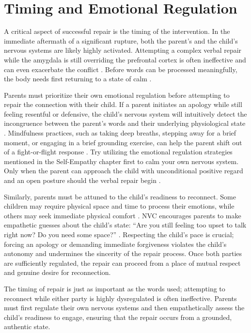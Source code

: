\section{Timing and Emotional Regulation}

A critical aspect of successful repair is the timing of the intervention.
In the immediate aftermath of a significant rupture, both the parent's and the child's nervous systems are likely highly activated.
Attempting a complex verbal repair while the amygdala is still overriding the prefrontal cortex is often ineffective and can even exacerbate the conflict \citep{gottman1997}.
Before words can be processed meaningfully, the body needs first returning to a state of calm \citep{porges2011}.

Parents must prioritize their own emotional regulation before attempting to repair the connection with their child.
If a parent initiates an apology while still feeling resentful or defensive, the child's nervous system will intuitively detect the incongruence between the parent's words and their underlying physiological state \citep{schore2001}.
Mindfulness practices, such as taking deep breaths, stepping away for a brief moment, or engaging in a brief grounding exercise, can help the parent shift out of a fight-or-flight response \citep{kabatzinn1990}.
Try utilizing the emotional regulation strategies mentioned in the Self-Empathy chapter first to calm your own nervous system.
Only when the parent can approach the child with unconditional positive regard and an open posture should the verbal repair begin \citep{rogers1961}.

Similarly, parents must be attuned to the child's readiness to reconnect.
Some children may require physical space and time to process their emotions, while others may seek immediate physical comfort \citep{lobue2022}.
NVC encourages parents to make empathetic guesses about the child's state: ``Are you still feeling too upset to talk right now? Do you need some space?'' \citep{rosenberg2003}.
Respecting the child's pace is crucial; forcing an apology or demanding immediate forgiveness violates the child's autonomy and undermines the sincerity of the repair process.
Once both parties are sufficiently regulated, the repair can proceed from a place of mutual respect and genuine desire for reconnection.

\begin{keyinsight}
The timing of repair is just as important as the words used; attempting to reconnect while either party is highly dysregulated is often ineffective.
Parents must first regulate their own nervous systems and then empathetically assess the child's readiness to engage, ensuring that the repair occurs from a grounded, authentic state.
\end{keyinsight}

